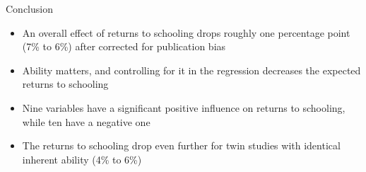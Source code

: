 \documentclass{beamer} %
\begin{document}
\begin{frame}{Conclusion}
    \begin{itemize}
        \item An overall effect of returns to schooling drops roughly one percentage point (7\% to 6\%) after corrected for publication bias
        \item Ability matters, and controlling for it in the regression decreases the expected returns to schooling
        \item Nine variables have a significant positive influence on returns to schooling, while ten have a negative one
        \item The returns to schooling drop even further for twin studies with identical inherent ability (4\% to 6\%)
    \end{itemize}
\end{frame}







\end{document}
